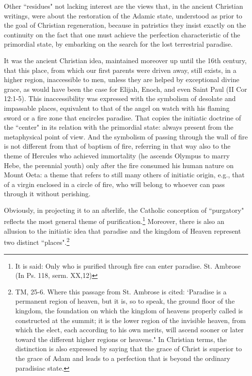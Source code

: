 Other ``residues" not lacking interest are the views that, in the ancient Christian writings, were about the restoration of the Adamic state, understood as prior to the goal of Christian regeneration, because in patristics they insist exactly on the continuity on the fact that one must achieve the perfection characteristic of the primordial state, by embarking on the search for the lost terrestrial paradise.

It was the ancient Christian idea, maintained moreover up until the 16th century, that this place, from which our first parents were driven away, still exists, in a higher region, inaccessible to men, unless they are helped by exceptional divine grace, as would have been the case for Elijah, Enoch, and even Saint Paul (II Cor 12:1-5). This inaccessibility was expressed with the symbolism of desolate and impassable places, equivalent to that of the angel on watch with his flaming sword or a fire zone that encircles paradise. That copies the initiatic doctrine of the ``center" in its relation with the primordial state: always present from the metaphysical point of view. And the symbolism of passing through the wall of fire is not different from that of baptism of fire, referring in that way also to the theme of Hercules who achieved immortality (he ascends Olympus to marry Hebe, the perennial youth) only after the fire consumed his human nature on Mount Oeta: a theme that refers to still many others of initiatic origin, e.g., that of a virgin enclosed in a circle of fire, who will belong to whoever can pass through it without perishing.

Obviously, in projecting it to an afterlife, the Catholic conception of ``purgatory" reflects the most general theme of purification.\footnote{It is said: Only who is purified through fire can enter paradise. St. Ambrose (In Ps. 118, serm. XX,12)} Moreover, there is also an allusion to the initiatic idea that paradise and the kingdom of Heaven represent two distinct ``places".\footnote{TM, 25-6. Where this passage from St. Ambrose is cited: `Paradise is a permanent region of heaven, but it is, so to speak, the ground floor of the kingdom, the foundation on which the kingdom of heavens properly called is constructed at the summit; it is the lower region of the invisible heaven, from which the elect, each according to his own merits, will ascend sooner or later toward the different higher regions or heavens." In Christian terms, the distinction is also expressed by saying that the grace of Christ is superior to the grace of Adam and leads to a perfection that is beyond the ordinary paradisiac state.}

